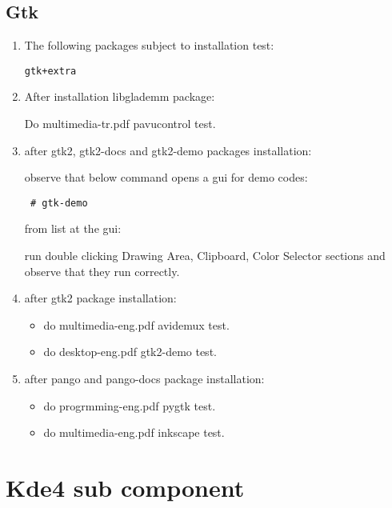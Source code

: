 \documentclass[a4paper,10pt]{article}
\begin{document}
\subsection*{Gtk}
\begin{enumerate}
\item The following packages subject to installation test:
\begin{verbatim}
gtk+extra
\end{verbatim}
\item After installation libglademm package:

Do multimedia-tr.pdf pavucontrol test.
 \item after gtk2, gtk2-docs and gtk2-demo  packages installation: 

observe that below command opens a gui for demo codes:
\begin{verbatim}
 # gtk-demo
\end{verbatim}

from list at the gui:

run double clicking Drawing Area, Clipboard, Color Selector sections and observe that they run correctly.

\item after gtk2 package installation: 
\begin{itemize}
 \item do multimedia-eng.pdf avidemux test.
\item do desktop-eng.pdf gtk2-demo test.
\end{itemize}
\item after pango and pango-docs package installation: 
\begin{itemize}
 \item do progrmming-eng.pdf pygtk test.
 \item do multimedia-eng.pdf inkscape test.
\end{itemize}

\end{enumerate}

\section{Kde4 sub component}
\end{document}
